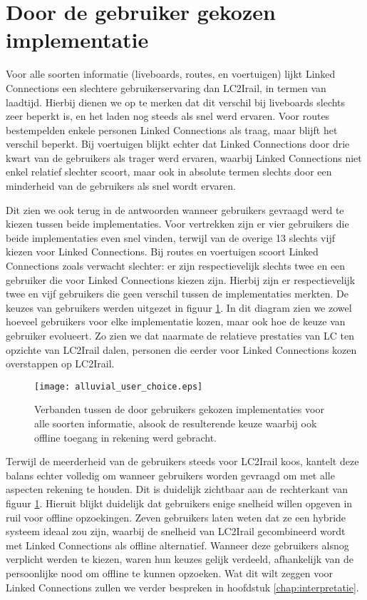 \section{Door de gebruiker gekozen implementatie}

Voor alle soorten informatie (liveboards, routes, en voertuigen) lijkt Linked Connections een slechtere gebruikerservaring dan LC2Irail, in termen van laadtijd. Hierbij dienen we op te merken dat dit verschil bij liveboards slechts zeer beperkt is, en het laden nog steeds als snel werd ervaren. Voor routes bestempelden enkele personen Linked Connections als traag, maar blijft het verschil beperkt. Bij voertuigen blijkt echter dat Linked Connections door drie kwart van de gebruikers als trager werd ervaren, waarbij Linked Connections niet enkel relatief slechter scoort, maar ook in absolute termen slechts door een minderheid van de gebruikers als snel wordt ervaren. 

Dit zien we ook terug in de antwoorden wanneer gebruikers gevraagd werd te kiezen tussen beide implementaties. Voor vertrekken zijn er vier gebruikers die beide implementaties even snel vinden, terwijl van de overige 13 slechts vijf kiezen voor Linked Connections. Bij routes en voertuigen scoort Linked Connections zoals verwacht slechter: er zijn respectievelijk slechts twee en een gebruiker die voor Linked Connections kiezen zijn. Hierbij zijn er respectievelijk twee en vijf gebruikers die geen verschil tussen de implementaties merkten. De keuzes van gebruikers werden uitgezet in figuur \ref{fig:alluvialUserChoices}. In dit diagram zien we zowel hoeveel gebruikers voor elke implementatie kozen, maar ook hoe de keuze van gebruiker evolueert. Zo zien we dat naarmate de relatieve prestaties van LC ten opzichte van LC2Irail dalen, personen die eerder voor Linked Connections kozen overstappen op LC2Irail.

\begin{figure}[ht]
	\centering
	\texttt{[image: alluvial\_user\_choice.eps]}
	\caption[Door gebruikers gekozen implementatie]{Verbanden tussen de door gebruikers gekozen implementaties voor alle soorten informatie, alsook de resulterende keuze waarbij ook offline toegang in rekening werd gebracht. }
	\label{fig:alluvialUserChoices}
\end{figure}

Terwijl de meerderheid van de gebruikers steeds voor LC2Irail koos, kantelt deze balans echter volledig om wanneer gebruikers worden gevraagd om met alle aspecten rekening te houden. Dit is duidelijk zichtbaar aan de rechterkant van figuur \ref{fig:alluvialUserChoices}. Hieruit blijkt duidelijk dat gebruikers enige snelheid willen opgeven in ruil voor offline opzoekingen. Zeven gebruikers laten weten dat ze een hybride systeem ideaal zou zijn, waarbij de snelheid van LC2Irail gecombineerd wordt met Linked Connections als offline alternatief. Wanneer deze gebruikers alsnog verplicht werden te kiezen, waren hun keuzes gelijk verdeeld, afhankelijk van de persoonlijke nood om offline te kunnen opzoeken. Wat dit wilt zeggen voor Linked Connections zullen we verder bespreken in hoofdstuk \ref{chap:interpretatie}.

